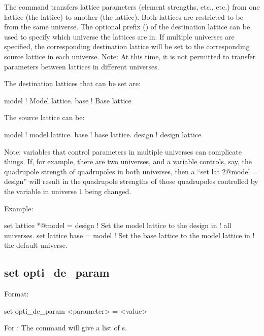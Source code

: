 {{The  command transfers lattice parameters (element strengths, etc., etc.)  from one
lattice (the  lattice) to another (the  lattice). Both lattices are
restricted to be from the same universe. The optional  prefix () of the
destination lattice can be used to specify which universe the lattices are in. If multiple universes
are specified, the corresponding destination lattice will be set to the corresponding source lattice
in each universe. Note: At this time, it is not permitted to transfer parameters between lattices in
different universes.

The destination lattices that can be set are:
\begin{example}
  model      ! Model lattice.
  base       ! Base lattice
\end{example}
The source lattice can be:
\begin{example}
  model       ! model lattice.
  base        ! base lattice.
  design      ! design lattice
\end{example}

Note: \tao variables that control parameters in multiple universes can complicate things. If, for
example, there are two universes, and a \tao variable controls, say, the quadrupole strength of
quadrupoles in both universes, then a ``set lat 2@model = design'' will result in the quadrupole
strengths of those quadrupoles controlled by the variable in universe 1 being changed.

Example:
\begin{example}
  set lattice *@model = design  ! Set the model lattice to the design in 
                                !   all universes.
  set lattice base = model      ! Set the base lattice to the model lattice in 
                                !   the default universe.
\end{example}


\subsection{set opti_de_param}
\label{s:set.opti.de.param}

Format:
\begin{example}
  set opti_de_param <parameter> = <value>
\end{example}

For : The  command will give a list of s.

}}
